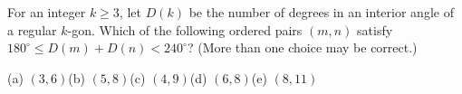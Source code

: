 For an integer $k\ge3$, let $D(k)$ be the number of degrees in an interior angle of a regular $k$-gon. Which of the following ordered pairs $(m,n)$ satisfy $180^\circ\le D(m)+D(n)<240^\circ$? (More than one choice may be correct.)

(a) $(3,6)$\quad (b) $(5,8)$\quad (c) $(4,9)$\quad (d) $(6,8)$\quad (e) $(8,11)$
